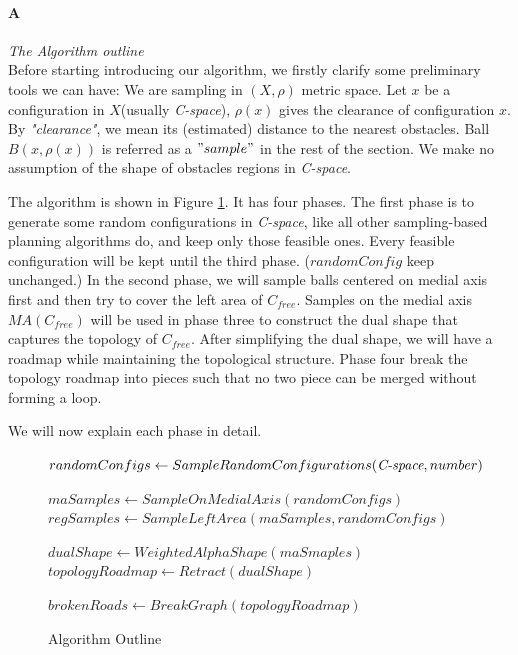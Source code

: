 \documentclass[11pt]{article}
\begin{document}
\paragraph{A} \emph{The Algorithm outline} \hfill \\
\indent Before starting introducing our algorithm, we firstly clarify some preliminary tools we can have: We are sampling in $(X, \rho)$ metric space. Let $x$ be a configuration in $X$(usually \emph{C-space}), $\rho(x)$ gives the clearance of configuration $x$. By \emph{"clearance"}, we mean its (estimated) distance to the nearest obstacles. Ball $B(x, \rho(x))$ is referred as a $"sample"$ in the rest of the section. We make no assumption of the shape of obstacles regions in \emph{C-space}. 

\indent The algorithm is shown in Figure \ref{fig:Algo}. It has four phases. The first phase is to generate some random configurations in \emph{C-space}, like all other sampling-based planning algorithms do, and keep only those feasible ones. Every feasible configuration will be kept until the third phase. ($randomConfig$ keep unchanged.) In the second phase, we will sample balls centered on medial axis first and then try to cover the left area of $C_{free}$. Samples on the medial axis $MA(C_{free})$ will be used in phase three to construct the dual shape that captures the topology of $C_{free}$. After simplifying the dual shape, we will have a roadmap while maintaining the topological structure. Phase four break the topology roadmap into pieces such that no two piece can be merged without forming a loop. 

\indent We will now explain each phase in detail.

\begin{figure}
  \begin{algorithmic}[1]
  
    \indent \State $randomConfigs \gets SampleRandomConfigurations( \emph{C-space}, number )$ 
    
    \indent \State $maSamples \gets SampleOnMedialAxis( randomConfigs )$
    \indent \State $regSamples \gets SampleLeftArea(maSamples, randomConfigs)$
    
    \indent \State $dualShape \gets WeightedAlphaShape( maSmaples )$
    \indent \State $topologyRoadmap \gets Retract(dualShape)$ 
    
    \indent \State $brokenRoads \gets BreakGraph( topologyRoadmap )$
    
    \indent 
	
  \EndFunction
  \end{algorithmic}
  \caption{\label{fig:Algo} Algorithm Outline}
\end{figure}
\end{document}
